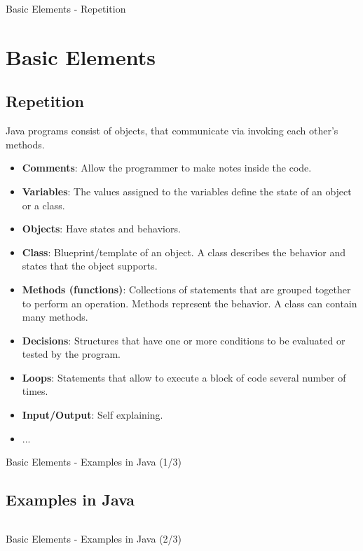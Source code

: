 \documentclass[11pt]{beamer}
\newcommand{\nologo}{\setbeamertemplate{logo}{}}
\newcommand{\reducedfontsizeextrasmall}{\fontsize{8pt}{9.6}\selectfont}
\begin{document}
	\begin{frame}{Basic Elements - Repetition}
		\section{Basic Elements}
		\subsection{Repetition}
		{\reducedfontsizeextrasmall
		Java programs consist of objects, that communicate via invoking each other's methods.
		
		\begin{itemize}
			\item{\textbf{Comments}: Allow the programmer to make notes inside the code.}
			\item{\textbf{Variables}: The values assigned to the variables define the state of an object or a class.}
			\item{\textbf{Objects}: Have states and behaviors.}
			\item{\textbf{Class}: Blueprint/template of an object. A class describes the behavior and states that the object supports.}
			\item{\textbf{Methods (functions)}: Collections of statements that are grouped together to perform an operation. Methods represent the behavior. A class can contain many methods.}
			\item{\textbf{Decisions}: Structures that have one or more conditions to be evaluated or tested by the program.}
			\item{\textbf{Loops}: Statements that allow to execute a block of code several number of times.}
			\item{\textbf{Input/Output}: Self explaining.}
			\item{...}
		\end{itemize}
		}
	\end{frame}
	
	{\nologo
	\begin{frame}{Basic Elements - Examples in Java (1/3)}
		\subsection{Examples in Java}
		\ssmall \inputminted[firstline=5,lastline=26]{java}{code/BasicElements.java}
	\end{frame}
	}
	
	{\nologo
	\begin{frame}{Basic Elements - Examples in Java (2/3)}
		\ssmall \inputminted[firstline=28,lastline=36]{java}{code/BasicElements.java}
	\end{frame}
	}
	
\end{document}
